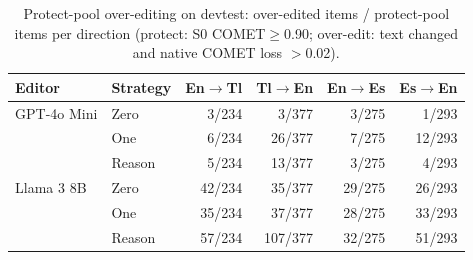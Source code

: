 \begin{table}[t]
\centering\footnotesize
\caption{Protect-pool over-editing on devtest: over-edited items / protect-pool items per direction (protect: S0 COMET$\geq$0.90; over-edit: text changed and native COMET loss $>$0.02).}
\label{tab:overedit}
\setlength{\tabcolsep}{3pt}
\begin{tabular}{llrrrr}
\toprule
Editor & Strategy & En$\to$Tl & Tl$\to$En & En$\to$Es & Es$\to$En \\
\midrule
GPT-4o Mini & Zero & 3/234 & 3/377 & 3/275 & 1/293 \\
 & One & 6/234 & 26/377 & 7/275 & 12/293 \\
 & Reason & 5/234 & 13/377 & 3/275 & 4/293 \\
\midrule
Llama 3 8B & Zero & 42/234 & 35/377 & 29/275 & 26/293 \\
 & One & 35/234 & 37/377 & 28/275 & 33/293 \\
 & Reason & 57/234 & 107/377 & 32/275 & 51/293 \\
\bottomrule
\end{tabular}
\end{table}
